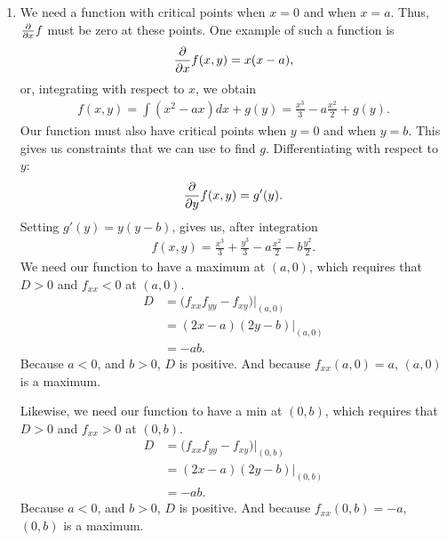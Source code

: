 \documentclass{article}
\begin{document}
\begin{enumerate}
\item %
We need a function with critical points when $x=0$ and when $x=a$. Thus, $\frac{\partial}{\partial x} f$ must be zero at these points. One example of such a function is
\begin{align*}
  \frac{\partial}{\partial x} f(x,y) = x(x-a),
\end{align*}
or, integrating with respect to $x$, we obtain
\begin{align*}
  f(x,y) = \int (x^2-ax)dx + g(y) = \frac{x^3}{3}-a\frac{x^2}{2}+g(y).
\end{align*}
Our function must also have critical points when $y=0$ and when $y=b$. This gives us constraints that we can use to find $g$. Differentiating with respect to $y$:
\begin{align*}
  \frac{\partial}{\partial y} f(x,y) = g'(y).
\end{align*}
Setting $g'(y)=y(y-b)$, gives us, after integration
\begin{align*}
  f(x,y) = \frac{x^3}{3}+ \frac{y^3}{3}-a\frac{x^2}{2}-b\frac{y^2}{2}.
\end{align*}
We need our function to have a maximum at $(a,0)$, which requires that $D>0$ and $f_{xx}<0$ at $(a,0)$.
\begin{align*}
  D &= \Big(f_{xx}f_{yy}-f_{xy}\Big)\Big|_{(a,0)} \\
  &= (2x-a)(2y-b)\Big|_{(a,0)} \\
  &= -ab.
\end{align*}
Because $a<0$, and $b>0$, $D$ is positive. And because $f_{xx}(a,0)=a$, $(a,0)$ is a maximum. 

Likewise, we need our function to have a min at $(0,b)$, which requires that $D>0$ and $f_{xx}>0$ at $(0,b)$.
\begin{align*}
  D &= \Big(f_{xx}f_{yy}-f_{xy}\Big)\Big|_{(0,b)} \\
  &= (2x-a)(2y-b)\Big|_{(0,b)} \\
  &= -ab.
\end{align*}
Because $a<0$, and $b>0$, $D$ is positive. And because $f_{xx}(0,b)=-a$, $(0,b)$ is a maximum. 


\end{enumerate}
\end{document}
